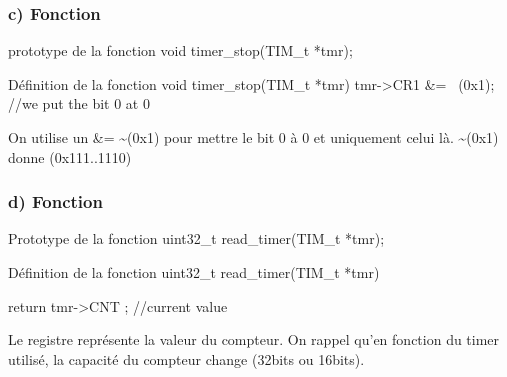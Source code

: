 



\subsubsection{c) Fonction}
\begin{Cpp}{prototype de la fonction } 
void timer_stop(TIM_t *tmr);
\end{Cpp}

\begin{Cpp}{Définition de la fonction } 
void timer_stop(TIM_t *tmr) {
    tmr->CR1 &= ~(0x1);  //we put the bit 0 at 0 
}
\end{Cpp}

On utilise un \&= \~{}(0x1) pour mettre le bit 0 à 0 et uniquement celui là.
\~{}(0x1) donne (0x111..1110)\\





\subsubsection{d) Fonction }
\begin{Cpp}{Prototype de la fonction} 
uint32_t read_timer(TIM_t *tmr);
\end{Cpp}

\begin{Cpp}{Définition de la fonction} 
uint32_t read_timer(TIM_t *tmr) {

	return tmr->CNT ;	//current value
}
\end{Cpp}

Le registre  représente la valeur du compteur. On rappel qu'en fonction du timer utilisé, la capacité du compteur change (32bits ou 16bits).


\newpage
